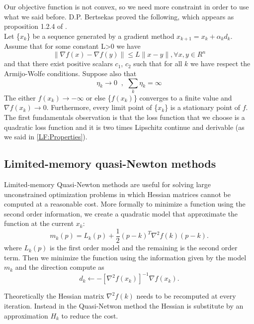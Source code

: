 Our objective function is not convex, so we need more constraint in order to use what we said before.
D.P. Bertsekas proved the following, which appears as proposition 1.2.4 of \cite{bert03}.
\\ Let \{$x_k$\} be a sequence generated by a gradient method $x_{k+1}=x_k+\alpha_kd_k$. Assume that for some constant L>0 we have
\begin{equation}
\label{assumption:momentum_descent2}
\| \nabla f(x)-\nabla f(y)\|\leq L\|x-y\|, \forall x,y \in R^n
\end{equation}
and that there exist positive scalars $c_1$, $c_2$ such that for all $k$  we have respect the Armijo-Wolfe conditions.
Suppose also that
\begin{equation}
\label{assumption:momentum_descent4}
\eta_k \to 0 \  \text{ , } \ \sum_k \eta_k = \infty
\end{equation}
The either $f(x_k)\to - \infty$ or else \{$f(x_k)$\} converges to a finite value and $\nabla f(x_k) \to 0$. Furthermore, every limit point of \{$x_k$\} is a stationary point of $f$.
The first fundamentals observation is that the loss function that we choose is a quadratic loss function and it is two times Lipschitz continue and derivable (as we said in \ref{LF:Properties}).

\subsection{Limited-memory quasi-Newton methods}
Limited-memory Quasi-Newton methods are useful for solving large unconstrained optimization problems in which Hessian matrices cannot be computed at a reasonable cost. More formally to minimize a function using the second order information, we create a quadratic model that approximate the function at the current $x_{k}$:
\begin{equation}
m_{k}(p)=L_{k}(p)+ \frac{1}{2}(p-k)^T\nabla^2 f(k)(p-k).
\end{equation}
where $L_{k}(p)$ is the first order model and the remaining is the second order term. Then we minimize the function using the information given by the model $m_{k}$ and the direction compute as 
\begin{equation}
d_{k} \leftarrow -[\nabla^2f(x_{k})]^{-1}\nabla f(x_{k}).
\end{equation}

Theoretically  the Hessian matrix $\nabla^2 f(k)$ needs to be recomputed at every iteration. Instead in the Quasi-Netwon method the Hessian is substitute by an approximation $ H_{k}$ to reduce the cost. 

